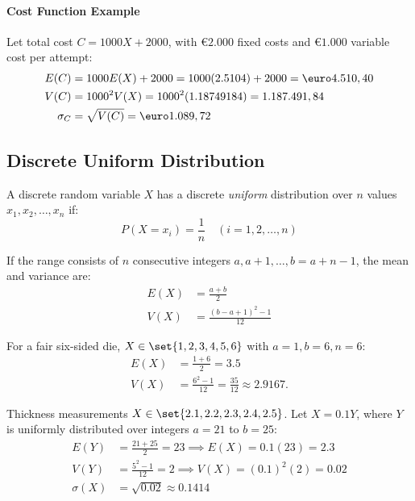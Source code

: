 \paragraph{Cost Function Example}
Let total cost $C = 1000X + 2000$, with \euro $2.000$ fixed costs and \euro $1.000$ variable cost per attempt:
\begin{align*}
    E(C) &= 1000 E(X) + 2000 = 1000(2.5104) + 2000 = \text{\euro}4.510,40 \\
    V(C) &= 1000^2 V(X) = 1000^2 (1.18749184) = 1.187.491,84 \\
    \sigma_C &= \sqrt{V(C)} = \text{\euro}1.089,72
\end{align*}

\subsection*{Discrete Uniform Distribution}

A discrete random variable $X$ has a discrete \emph{uniform} distribution over $n$ values $x_1, x_2, \dots, x_n$ if:
\[
    P(X = x_i) = \frac{1}{n} \quad (i = 1, 2, \dots, n)
\]

If the range consists of $n$ consecutive integers $a, a+1, \dots, b = a + n - 1$, the mean and variance are:
\begin{align*}
    E(X) &= \frac{a + b}{2} \\
    V(X) &= \frac{(b - a + 1)^2 - 1}{12}
\end{align*}

\begin{example}
For a fair six-sided die, $X \in \set{1, 2, 3, 4, 5, 6}$ with $a=1, b=6, n=6$:
\begin{align*}
    E(X) &= \frac{1 + 6}{2} = 3.5 \\
    V(X) &= \frac{6^2 - 1}{12} = \frac{35}{12} \approx 2.9167.
\end{align*}
\end{example}


\begin{example}
    Thickness measurements $X \in \set{2.1, 2.2, 2.3, 2.4, 2.5}$. Let $X = 0.1Y$, where $Y$ is uniformly distributed over integers $a=21$ to $b=25$:
    \begin{align*}
        E(Y) &= \frac{21 + 25}{2} = 23 \implies E(X) = 0.1(23) = 2.3 \\
        V(Y) &= \frac{5^2 - 1}{12} = 2 \implies V(X) = (0.1)^2 (2) = 0.02 \\
        \sigma(X) &= \sqrt{0.02} \approx 0.1414
    \end{align*}
\end{example}